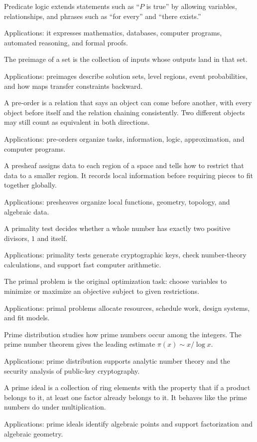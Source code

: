 Predicate logic extends statements such as “$P$ is true” by allowing variables, relationships, and phrases such as “for every” and “there exists.” \par\noindent Applications: it expresses mathematics, databases, computer programs, automated reasoning, and formal proofs.

The preimage of a set is the collection of inputs whose outputs land in that set. \par\noindent Applications: preimages describe solution sets, level regions, event probabilities, and how maps transfer constraints backward.

A pre-order is a relation that says an object can come before another, with every object before itself and the relation chaining consistently. Two different objects may still count as equivalent in both directions. \par\noindent Applications: pre-orders organize tasks, information, logic, approximation, and computer programs.

A presheaf assigns data to each region of a space and tells how to restrict that data to a smaller region. It records local information before requiring pieces to fit together globally. \par\noindent Applications: presheaves organize local functions, geometry, topology, and algebraic data.

A primality test decides whether a whole number has exactly two positive divisors, $1$ and itself. \par\noindent Applications: primality tests generate cryptographic keys, check number-theory calculations, and support fast computer arithmetic.

The primal problem is the original optimization task: choose variables to minimize or maximize an objective subject to given restrictions. \par\noindent Applications: primal problems allocate resources, schedule work, design systems, and fit models.

Prime distribution studies how prime numbers occur among the integers. The prime number theorem gives the leading estimate $\pi(x)\sim x/\log x$. \par\noindent Applications: prime distribution supports analytic number theory and the security analysis of public-key cryptography.

A prime ideal is a collection of ring elements with the property that if a product belongs to it, at least one factor already belongs to it. It behaves like the prime numbers do under multiplication. \par\noindent Applications: prime ideals identify algebraic points and support factorization and algebraic geometry.

